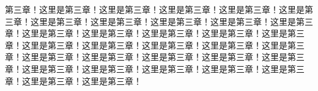 第三章！这里是第三章！这里是第三章！这里是第三章！这里是第三章！这里是第三章！这里是第三章！这里是第三章！这里是第三章！这里是第三章！这里是第三章！这里是第三章！这里是第三章！这里是第三章！这里是第三章！这里是第三章！这里是第三章！这里是第三章！这里是第三章！这里是第三章！这里是第三章！这里是第三章！这里是第三章！这里是第三章！这里是第三章！这里是第三章！这里是第三章！这里是第三章！这里是第三章！这里是第三章！这里是第三章！这里是第三章！这里是第三章！